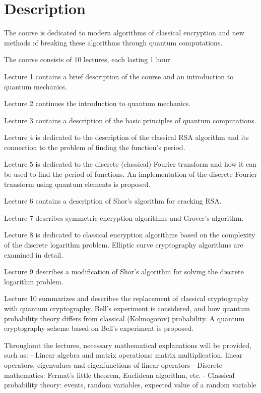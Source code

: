 \section{Description}
The course is dedicated to modern algorithms of classical encryption and new methods of breaking these algorithms through quantum computations.

The course consists of 10 lectures, each lasting 1 hour.

Lecture 1 contains a brief description of the course and an introduction to quantum mechanics.

Lecture 2 continues the introduction to quantum mechanics.

Lecture 3 contains a description of the basic principles of quantum computations.

Lecture 4 is dedicated to the description of the classical RSA algorithm and its connection to the problem of finding the function’s period.

Lecture 5 is dedicated to the discrete (classical) Fourier transform and how it can be used to find the period of functions. An implementation of the discrete Fourier transform using quantum elements is proposed.

Lecture 6 contains a description of Shor's algorithm for cracking RSA.

Lecture 7 describes symmetric encryption algorithms and Grover’s algorithm.

Lecture 8 is dedicated to classical encryption algorithms based on the complexity of the discrete logarithm problem. Elliptic curve cryptography algorithms are examined in detail.

Lecture 9 describes a modification of Shor's algorithm for solving the discrete logarithm problem.

Lecture 10 summarizes and describes the replacement of classical cryptography with quantum cryptography. Bell's experiment is considered, and how quantum probability theory differs from classical (Kolmogorov) probability. A quantum cryptography scheme based on Bell's experiment is proposed.

Throughout the lectures, necessary mathematical explanations will be provided, such as:
- Linear algebra and matrix operations: matrix multiplication, linear operators, eigenvalues and eigenfunctions of linear operators
- Discrete mathematics: Fermat's little theorem, Euclidean algorithm, etc.
- Classical probability theory: events, random variables, expected value of a random variable
